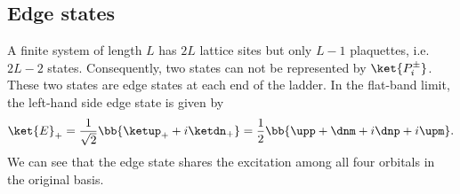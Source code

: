 



\subsection{Edge states}
A finite system of length $L$ has $2L$ lattice sites but only $L-1$ plaquettes, i.e. $2L - 2$ states.
Consequently, two states can not be represented by $\ket{P_i^\pm}$.
These two states are edge states at each end of the ladder. In the flat-band limit, the left-hand side edge state is given by
\begin{align}
    \ket{E}_+ = \frac{1}{\sqrt{2}} \bb{ \ketup_+ + i \ketdn_+ } = \frac{1}{2} \bb{ \upp + \dnm + i\dnp + i\upm }.
\end{align}
We can see that the edge state shares the excitation among all four orbitals in the original basis.

